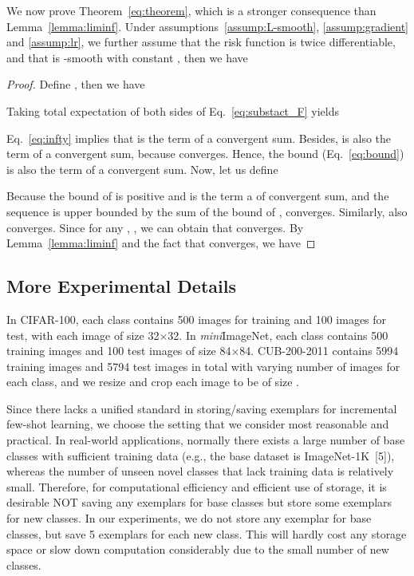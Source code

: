 \documentclass{article}
\newenvironment{customthm}[1]
  {\renewcommand\theinnercustomthm{#1}\innercustomthm}
  {\endinnercustomthm}
\begin{document}
We now prove {Theorem~\ref{eq:theorem}}, which is a stronger consequence than Lemma~\ref{lemma:liminf}. 
\begin{customthm}{4.1}\label{eq:theorem_a}
Under assumptions~\ref{assump:L-smooth}, \ref{assump:gradient} and \ref{assump:lr}, we further assume that the risk function  is twice differentiable, and that  is -smooth with constant , then we have

\end{customthm}
\begin{proof}
Define , then we have

Taking total expectation of both sides of Eq.~\ref{eq:substact_F} yields


Eq.~\ref{eq:infty} implies that  is the term of a convergent sum. Besides,  is also the term of a convergent sum, because  converges. Hence, the bound (Eq.~\ref{eq:bound}) is also the term of a convergent sum.
Now, let us define

Because the bound of  is positive and is the term a of convergent sum, and the sequence  is upper bounded by the sum of the bound of ,  converges. Similarly,  also converges. Since for any , , we can obtain that  converges. By Lemma~\ref{lemma:liminf} and the fact that  converges, we have

\end{proof}

\subsection{More Experimental Details} \label{appendix:setup}
In CIFAR-100, each class contains 500 images for training and 100 images for test, with each image of size 32×32. In \emph{mini}ImageNet, each class contains 500 training images and 100 test images of size 84×84. CUB-200-2011 contains 5994 training images and 5794 test images in total with varying number of images for each class, and we resize and crop each image to be of size .

Since there lacks a unified standard in storing/saving exemplars for incremental few-shot learning, we choose the setting that we consider most reasonable and practical. In real-world applications, normally there exists a large number of base classes with sufficient training data (e.g., the base dataset is ImageNet-1K~[5]), whereas the number of unseen novel classes that lack training data is relatively small. Therefore, for computational efficiency and efficient use of storage, it is desirable NOT saving any exemplars for base classes but store some exemplars for new classes. In our experiments, we do not store any exemplar for base classes, but save 5 exemplars for each new class. This will hardly cost any storage space or slow down computation considerably due to the small number of new classes.
\end{document}
